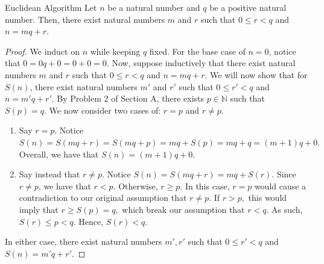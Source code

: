 \begin{problem}{Euclidean Algorithm}
    Let $n$ be a natural number and $q$ be a positive natural number. 
    Then, there exist natural numbers $m$ and $r$ such that $0 \leq r < q$ and $n = mq + r.$
\end{problem}
\begin{proof}
    We induct on $n$ while keeping $q$ fixed.  
    For the base case of $n = 0$, notice that $0 = 0q + 0 = 0 + 0 = 0.$
    Now, suppose inductively that there exist natural numbers $m$ and $r$ such that $0 \leq r < q$ and $n = mq + r.$
    We will now show that for $S(n)$, there exist natural numbers $m'$ and $r'$ such that $0 \leq r' < q$ and $n = m'q + r'.$
    By Problem 2 of Section A, there exists $p \in \mathbb{N}$ such that $S(p) = q.$ 
    We now consider two cases of: $r = p$ and $r \neq p$.
    \begin{enumerate}
        \item Say $r = p.$ 
        Notice $S(n) = S(mq + r) = S(mq + p) = mq + S(p) = mq + q = (m + 1)q + 0.$ 
        Overall, we have that $S(n) = (m + 1)q + 0.$
        \item Say instead that $r \neq p$. 
        Notice $S(n) = S(mq + r) = mq + S(r).$ 
        Since $r \neq p$, we have that $r < p$. 
        Otherwise, $r \geq p$. 
        In this case, $r = p$ would cause a contradiction to our original assumption that $r \neq p$.
        If $r > p,$ this would imply that $r \geq S(p) = q,$ which break our assumption that $r < q.$ 
        As such, $S(r) \leq p < q.$ Hence, $S(r) < q.$
    \end{enumerate}
    In either case, there exist natural numbers $m', r'$ such that $0 \leq r' < q$ and $S(n) = m'q + r'.$    
\end{proof}